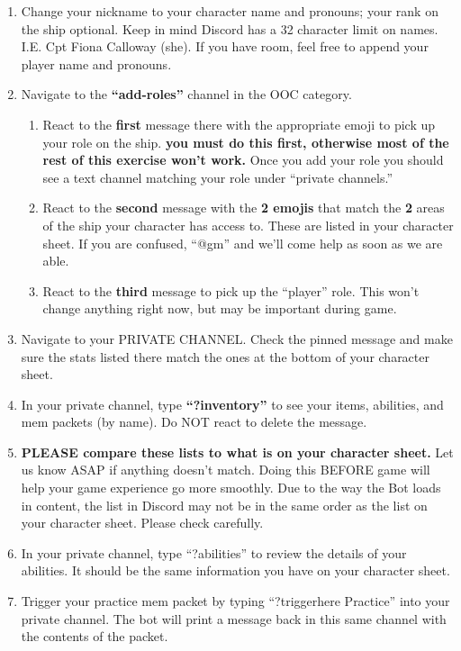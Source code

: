 \documentclass[green]{TMFHope}
\begin{document}
\begin{enumerate}
  \item Change your nickname to your character name and pronouns; your rank on the ship optional. Keep in mind Discord has a 32 character limit on names. I.E. Cpt Fiona Calloway (she). If you have room, feel free to append your player name and pronouns.
  \item Navigate to the \textbf{``add-roles''} channel in the OOC category.
	\begin{enumerate}
  \item React to the \textbf{first} message there with the appropriate emoji to pick up your role on the ship. \textbf{you must do this first, otherwise most of the rest of this exercise won't work.} Once you add your role you should see a text channel matching your role under ``private channels.''
	\item React to the \textbf{second} message with the \textbf{2 emojis} that match the \textbf{2} areas of the ship your character has access to. These are listed in your character sheet. If you are confused, ``@gm'' and we'll come help as soon as we are able.
	\item React to the \textbf{third} message to pick up the ``player'' role. This won't change anything right now, but may be important during game.
  \end{enumerate}
	\item Navigate to your PRIVATE CHANNEL. Check the pinned message and make sure the stats listed there match the ones at the bottom of your character sheet.
	\item In your private channel, type \textbf{``?inventory''} to see your items, abilities, and mem packets (by name). Do NOT react to delete the message.
	\item \textbf{PLEASE compare these lists to what is on your character sheet.} Let us know ASAP if anything doesn't match. Doing this BEFORE game will help your game experience go more smoothly. Due to the way the Bot loads in content, the list in Discord may not be in the same order as the list on your character sheet. Please check carefully.
	\item In your private channel, type ``?abilities'' to review the details of your abilities. It should be the same information you have on your character sheet.
  \item Trigger your practice mem packet by typing ``?triggerhere Practice'' into your private channel. The bot will print a message back in this same channel with the contents of the packet.

\end{enumerate}
\end{document}
